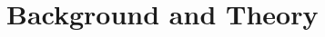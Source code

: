 \documentclass[ms]{nuthesis}
\begin{document}
%
%
%
%



\chapter{Background and Theory}
\end{document}
